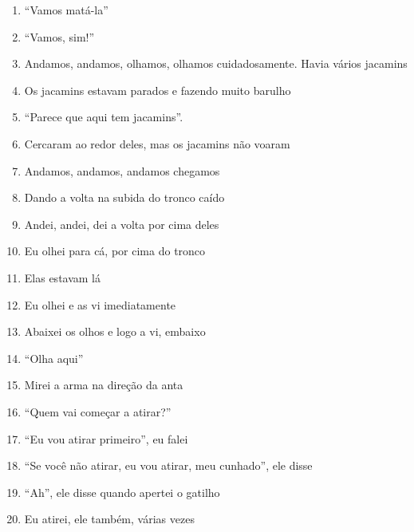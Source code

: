 \begin{enumerate}
 \item ``Vamos matá-la''

 \item ``Vamos, sim!''

 \begin{center}\end{center}

 \item Andamos, andamos, olhamos, olhamos cuidadosamente. Havia vários jacamins

 \item Os jacamins estavam parados e fazendo muito barulho

 \item ``Parece que aqui tem jacamins''.

 \item Cercaram ao redor deles, mas os jacamins não voaram

 \item Andamos, andamos, andamos chegamos

 \item Dando a volta na subida do tronco caído

 \item Andei, andei, dei a volta por cima deles

 \item Eu olhei para cá, por cima do tronco

 \item Elas estavam lá

 \item Eu olhei e as vi imediatamente

 \item Abaixei os olhos e logo a vi, embaixo

 \item ``Olha aqui''

 \item Mirei a arma na direção da anta

 \item ``Quem vai começar a atirar?''

 \item ``Eu vou atirar primeiro'', eu falei

 \item ``Se você não atirar, eu vou atirar, meu cunhado'', ele disse

 \item ``Ah'', ele disse quando apertei o gatilho

 \item Eu atirei, ele também, várias vezes


\end{enumerate}
